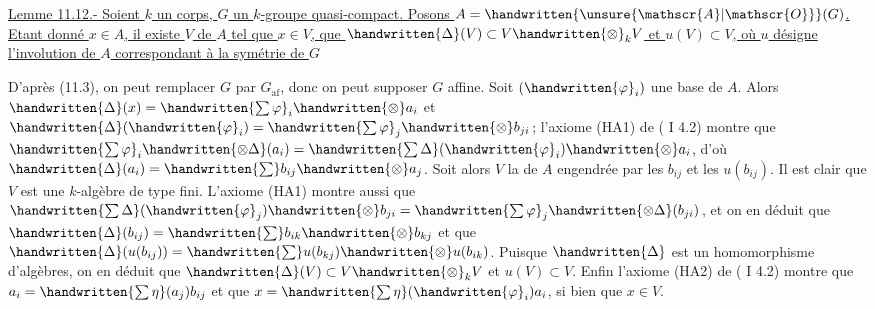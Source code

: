 

\uline{Lemme 11.12.- Soient $k$ un corps, $G$ un $k$-groupe quasi-compact. Posons $A=\handwritten{\unsure{\mathscr{A}|\mathscr{O}}}(G)$. Etant donné $x\in A$, il existe  $V$ de $A$ tel que $x\in V$, que $\handwritten{\Delta}(V)\subset V\handwritten{\otimes}_k V$ et $u(V)\subset V$, où $u$ désigne l'involution de $A$ correspondant à la symétrie de $G$}

D'après (11.3), on peut remplacer $G$ par $G_{\mathrm{af}}$, donc on peut supposer $G$ affine. Soit $(\handwritten{\varphi}_i)$ une base de $A$. Alors $\handwritten{\Delta}(x)=\handwritten{\sum\varphi}_i\handwritten{\otimes}a_i$ et $\handwritten{\Delta}(\handwritten{\varphi}_i)=\handwritten{\sum\varphi}_j\handwritten{\otimes}b_{ji}$; l'axiome (HA1) de ( I 4.2) montre que $\handwritten{\sum\varphi}_i\handwritten{\otimes\Delta}(a_i)=\handwritten{\sum\Delta}(\handwritten{\varphi}_i)\handwritten{\otimes}a_i$, d'où $\handwritten{\Delta}(a_i)=\handwritten{\sum}b_{ij}\handwritten{\otimes}a_j$. Soit alors $V$ la  de $A$ engendrée par les $b_{ij}$ et les $u(b_{ij})$. Il est clair que $V$ est une $k$-algèbre de type fini. L'axiome (HA1) montre aussi que $\handwritten{\sum\Delta}(\handwritten{\varphi}_j)\handwritten{\otimes}b_{ji}=\handwritten{\sum\varphi}_j\handwritten{\otimes\Delta}(b_{ji})$, et on en déduit que $\handwritten{\Delta}(b_{ij})=\handwritten{\sum}b_{ik}\handwritten{\otimes}b_{kj}$ et que $\handwritten{\Delta}(u(b_{ij}))=\handwritten{\sum}u(b_{kj})\handwritten{\otimes}u(b_{ik})$. Puisque $\handwritten{\Delta}$ est un homomorphisme d'algèbres, on en déduit que $\handwritten{\Delta}(V)\subset V\handwritten{\otimes}_k V$ et $u(V)\subset V$. Enfin l'axiome (HA2) de ( I 4.2) montre que $a_i=\handwritten{\sum\eta}(a_j)b_{ij}$ et que $x=\handwritten{\sum\eta}(\handwritten{\varphi}_i)a_i$, si bien que $x\in V$.

